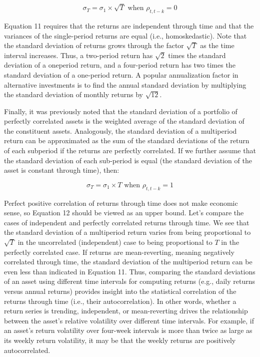 \documentclass[11pt]{article}
\begin{document}
\begin{equation*}
\sigma_{T}=\sigma_{1} \times \sqrt{T} \text { when } \rho_{t, t-k}=0 \tag{11}
\end{equation*}


Equation 11 requires that the returns are independent through time and that the variances of the single-period returns are equal (i.e., homoskedastic). Note that the standard deviation of returns grows through the factor $\sqrt{T}$ as the time interval increases. Thus, a two-period return has $\sqrt{2}$ times the standard deviation of a oneperiod return, and a four-period return has two times the standard deviation of a one-period return. A popular annualization factor in alternative investments is to find the annual standard deviation by multiplying the standard deviation of monthly returns by $\sqrt{12}$.

Finally, it was previously noted that the standard deviation of a portfolio of perfectly correlated assets is the weighted average of the standard deviation of the constituent assets. Analogously, the standard deviation of a multiperiod return can be approximated as the sum of the standard deviations of the return of each subperiod if the returns are perfectly correlated. If we further assume that the standard deviation of each sub-period is equal (the standard deviation of the asset is constant through time), then:


\begin{equation*}
\sigma_{T}=\sigma_{1} \times T \text { when } \rho_{t, t-k}=1 \tag{12}
\end{equation*}


Perfect positive correlation of returns through time does not make economic sense, so Equation 12 should be viewed as an upper bound. Let's compare the cases of independent and perfectly correlated returns through time. We see that the standard deviation of a multiperiod return varies from being proportional to $\sqrt{T}$ in the uncorrelated (independent) case to being proportional to $T$ in the perfectly correlated case. If returns are mean-reverting, meaning negatively correlated through time, the standard deviation of the multiperiod return can be even less than indicated in Equation 11. Thus, comparing the standard deviations of an asset using different time intervals for computing returns (e.g., daily returns versus annual returns) provides insight into the statistical correlation of the returns through time (i.e., their autocorrelation). In other words, whether a return series is trending, independent, or mean-reverting drives the relationship between the asset's relative volatility over different time intervals. For example, if an asset's return volatility over four-week intervals is more than twice as large as its weekly return volatility, it may be that the weekly returns are positively autocorrelated.
\end{document}
